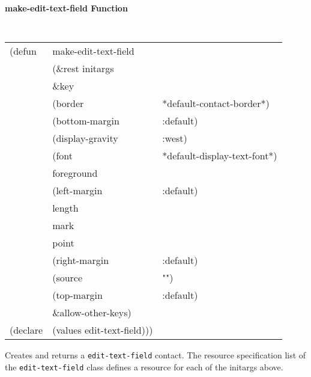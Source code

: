 {\samepage
{\large {\bf make-edit-text-field \hfill Function}} 
\begin{flushright} \parbox[t]{6.125in}{
\tt
\begin{tabular}{lll}
\raggedright
(defun & make-edit-text-field \\
       & (\&rest initargs \\
       & \&key  \\
       & (border              & *default-contact-border*) \\ 
       & (bottom-margin       & :default) \\ 
       & (display-gravity             & :west) \\ 
       & (font                & *default-display-text-font*) \\ 
       & foreground \\
       & (left-margin         & :default) \\ 
       & length \\ 
       & mark                &  \\ 
       & point               &  \\ 
       & (right-margin        & :default) \\ 
       & (source              & "")\\ 
       & (top-margin          & :default) \\
       &   \&allow-other-keys) \\
(declare & (values   edit-text-field)))
\end{tabular}
\rm

}\end{flushright}}

\begin{flushright} \parbox[t]{6.125in}{
Creates and returns a {\tt edit-text-field} contact.
The resource specification list of the {\tt edit-text-field} class defines
a resource for each of the initargs above.

}\end{flushright}





